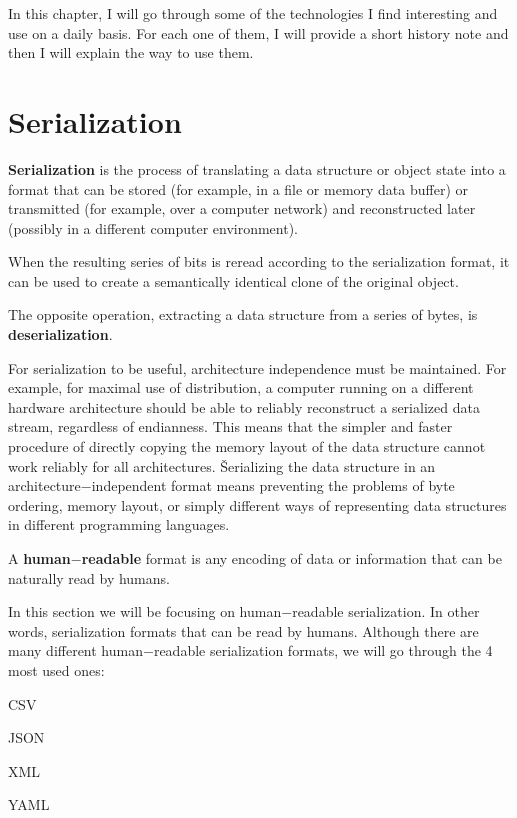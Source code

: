 In this chapter, I will go through some of the technologies I find interesting and use on a daily basis. For each one
of them, I will provide a short history note and then I will explain the way to use them.

\section{Serialization}

\bd[Serialization]
\textbf{Serialization} is the process of translating a data structure or object state into a format that can be stored
(for example, in a file or memory data buffer) or transmitted (for example, over a computer network) and reconstructed
later (possibly in a different computer environment).
\ed

When the resulting series of bits is reread according to the serialization format, it can be used to create a
semantically identical clone of the original object.

\bd[Deserialization]
The opposite operation, extracting a data structure from a series of bytes, is \textbf{deserialization}.
\ed

For serialization to be useful, architecture independence must be maintained. For example, for maximal use of
distribution, a computer running on a different hardware architecture should be able to reliably reconstruct a
serialized data stream, regardless of endianness. This means that the simpler and faster procedure of directly
copying the memory layout of the data structure cannot work reliably for all architectures. \v

Serializing the data structure in an architecture$-$independent format means preventing the problems of byte
ordering, memory layout, or simply different ways of representing data structures in different programming languages.

A \textbf{human$-$readable} format is any encoding of data or information that can be naturally read by humans.
\ed

In this section we will be focusing on human$-$readable serialization. In other words, serialization formats that can
be read by humans. Although there are many different human$-$readable serialization formats, we will go through the 4
most used ones:
\bit
\item CSV
\item JSON
\item XML
\item YAML
\eit

